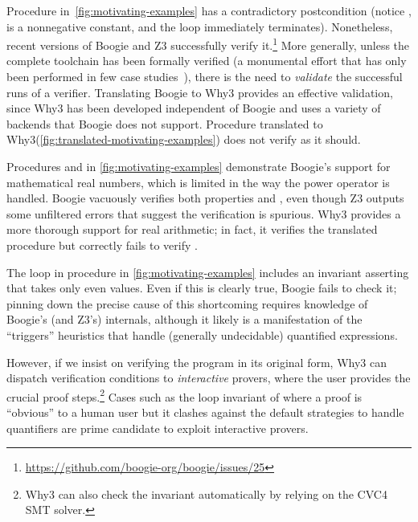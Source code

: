 \documentclass[a4paper,final]{llncs}
\newif\iflong
\newcommand{\Boogie}{Boogie\xspace}
\newcommand{\Why}{Why3\xspace}
\begin{document}
Procedure  in~\autoref{fig:motivating-examples} has a contradictory postcondition (notice ,  is a nonnegative constant, and the loop immediately terminates).
Nonetheless, recent versions of \Boogie and Z3 successfully verify it.\footnote{\url{https://github.com/boogie-org/boogie/issues/25}}
More generally, unless the complete toolchain has been formally verified (a monumental effort that has only been performed in few case studies~\cite{Leroy09,KleinAEHCDEEKNSTW10,KumarMNO14}), there is the need to \emph{validate} the successful runs of a verifier.
Translating \Boogie to \Why provides an effective validation, since \Why has been developed independent of \Boogie and uses a variety of backends that \Boogie does not support.
Procedure  translated to \Why (\autoref{fig:translated-motivating-examples}) does not verify as it should.

Procedures  and  in \autoref{fig:motivating-examples} demonstrate \Boogie's support for mathematical real numbers, which is limited in the way the power operator \B{**} is handled. \Boogie vacuously verifies both properties  and , even though Z3 outputs some unfiltered errors that suggest the verification is spurious{}\iflong{} (the power operator \B{**} is not properly supported); indeed, only the inequality encoded by \B{lemma_yes} is correct\fi.
\Why provides a more thorough support for real arithmetic\iflong, both by translating to backends such as Alt-Ergo and by providing a more effective encoding in Z3\fi; 
in fact, it verifies the translated procedure  but correctly fails to verify .

The loop in procedure  in \autoref{fig:motivating-examples} includes an invariant asserting that  takes only even values.
Even if this is clearly true, \Boogie fails to check it; 
pinning down the precise cause of this shortcoming requires knowledge of \Boogie's (and Z3's) internals, although it likely is a manifestation of the ``triggers'' heuristics that handle  (generally undecidable) quantified expressions. 
\iflong
Based on this knowledge, there are specification patterns that try to work around such idiosyncrasies; in the example, one could introduce a ``witness'' ghost variable \B{k} such that \B{i == 2*k} is an invariant.
\fi
However, if we insist on verifying the program in its original form, \Why can dispatch verification conditions to \emph{interactive} provers, where the user provides the crucial proof steps.\footnote{\Why can also check the invariant automatically by relying on the CVC4 SMT solver.}
Cases such as the loop invariant of  where a proof is ``obvious'' to a human user but it clashes against the default strategies to handle quantifiers are prime candidate to exploit interactive provers.
\iflong
Thus, translating \Boogie to \Why provides another means of exploiting the latter's versatile support for interactive provers and multiple backends.
\fi
\end{document}

